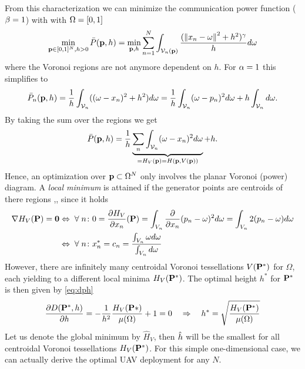 \documentclass[smallabstract,smallcaptions]{dccpaper}
\newcommand{\bP}{\ensuremath{\vp}}          %
\newcommand{\Pbar}{\ensuremath{\bar{P}}}         %
\newcommand{\Vor}{\ensuremath{\mathcal{V}}}         %
\begin{document}
From this characterization we can minimize the communication power function ($\beta=1$) with  with
$\Omega=[0,1]$
%
\begin{align}
  \min_{\bP\in[0,1]^N,h>0} \Pbar(\bP,h)= \min_{\bP,h} \sum_{n=1}^N \int_{\Vor_n(\bP)}
  \frac{(\Norm{x_n-\ome}^2 + h^2)^\gam}{h}  d\ome
\end{align}
%
where the Voronoi regions are not anymore dependent on $h$. For $\alpha=1$ this simplifies to
%
\begin{align}
  \Pbar_n(\bP,h)=  \frac{1}{h}\int_{\Vor_n}( (\ome-x_n)^2+h^2) d\ome = \frac{1}{h} \int_{\Vor_n} (\ome-p_n)^2
  d\ome + h\int_{\Vor_n} d\ome.
\end{align}
%
By taking the sum over the regions we get
%
\begin{align}
  \Pbar(\bP,h)= \frac{1}{h} \underbrace{\sum_n\int_{\Vor_n} (\ome-x_n)^2 d\ome}_{=H_V(\bP)=H(\bP,V(\bP))} + h
  \label{eq:dph}.
\end{align}
%
Hence, an optimization over $\bP\subset\Omega^N$ only involves the planar Voronoi (power) diagram. A \emph{local minimum} is
attained if the generator points are centroids of there regions \cite{DFG99},\cite{CMKB02}, since it holds
%
\begin{align}
  \nabla H_V(\vP) = \zero &\LRA \forall n \colon 0= \frac{\partial H_V}{\partial x_n} (\vP)=\int_{V_n}
  \frac{\partial}{\partial x_n} (p_n-\ome)^2 d\ome = \int_{V_n} 2(p_n-\ome) d\ome \\
  &\LRA \forall n\colon x_n^*=c_n=\frac{ \int_{V_n} \ome d\ome}{\int_{V_n} d\ome}
\end{align}
%
However, there are infinitely many centroidal Voronoi tessellations $V(\mathbf P ^*)$ for $\Omega$, each yielding to a different local
minima $H_V(\mathbf P ^*)$. The optimal height $h^*$ for $\mathbf P ^*$ is then given by 
\eqref{eq:dph}
%
\begin{align}
  \frac{\partial D(\mathbf P ^*,h)}{\partial h} = -\frac{1}{h^{2}} \frac{H_V(\mathbf P *)}{\mu(\Omega)} + 1=0\quad \Rightarrow\quad   h^* =
  \sqrt{\frac{H_V(\mathbf P ^*)}{\mu(\Omega)}}
\end{align}
%
Let us denote the global minimum by $\hat{H}_V$, then $\hat{h}$ will be the smallest for all centroidal
Voronoi tessellations  $H_V(\mathbf P ^*)$. 
For this simple one-dimensional case, we can actually derive the optimal UAV deployment for any $N$.
\fi
%  
\end{document}

